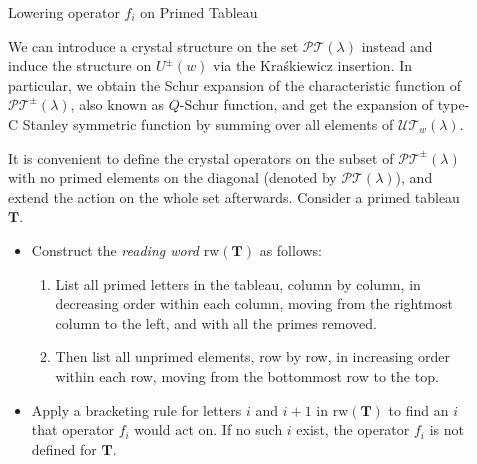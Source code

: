 \documentclass[final]{beamer}
\theoremstyle{definition}
\numberwithin{equation}{section}
\newlength{\sepwid}
\newlength{\onecolwid}
\newlength{\twocolwid}
\begin{document}
\begin{frame}[t]
\begin{columns}[t]
\begin{column}{\twocolwid}
\begin{columns}[t]
\end{columns}

\end{column}

\begin{column}{\sepwid}\end{column} %

\begin{column}{\onecolwid}\vspace{-.6in} %


\begin{block}{Lowering operator $f_i$ on Primed Tableau}

We can introduce a crystal structure on the set $\mathcal{PT} (\lambda)$ instead and induce the structure on $U^{\pm}(w)$ via the Kra\'skiewicz insertion. 
In particular, we obtain the Schur expansion of the characteristic function of $\mathcal{PT}^\pm (\lambda)$, also known as $Q$-Schur function, and get the expansion of type-C Stanley symmetric function by summing over all elements of $\mathcal{UT}_w (\lambda)$.

It is convenient to define the crystal operators on the subset of $\mathcal{PT}^\pm (\lambda)$ with no primed elements on the diagonal (denoted by $\mathcal{PT} (\lambda)$), and extend the action on the whole set afterwards. Consider a primed tableau $\mathbf{T}$.

\begin{itemize}
\item Construct the \textit{reading word}  $\mathrm{rw}(\mathbf{T})$ as follows:

	\begin{enumerate}
	\item List all primed letters in the tableau, column by column, in decreasing order within each column, moving from the rightmost column to the left, and with all the primes removed.
	\item Then list all unprimed elements, row by row, in increasing order within each row, moving from the bottommost row to the top.
	\end{enumerate}

\item Apply a bracketing rule for letters $i$ and $i+1$ in $\mathrm{rw}(\mathbf{T})$ to find an $i$ that operator $f_i$ would act on. If no such $i$ exist, the operator $f_i$ is not defined for $\mathbf{T}$.


\end{itemize}
\end{block}
\end{column}
\end{columns}
\end{frame}
\end{document}
